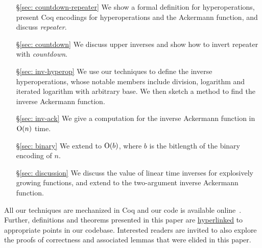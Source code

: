 \begin{itemize}
	\item[\S\ref{sec: countdown-repeater}] We show a formal definition for hyperoperations, present Coq encodings for hyperoperations and the Ackermann function, and discuss \emph{repeater}.
	\item[\S\ref{sec: countdown}] We discuss upper inverses and show how to invert repeater with \emph{countdown}.
	\item[\S\ref{sec: inv-hyperop}] We use our techniques to define the inverse hyperoperations, whose notable members include division, logarithm and iterated logarithm with arbitrary base. We then sketch a method to find the inverse Ackermann function.
	\item[\S\ref{sec: inv-ack}] We give a computation for the inverse Ackermann function in $\text{O}(n)$ time.
	\item[\S\ref{sec: binary}] We extend to $\text{O}(b)$, where $b$ is the bitlength
	of the binary encoding of $n$.
	\item[\S\ref{sec: discussion}] We discuss the value of linear time inverses for
explosively growing functions, and extend to the two-argument inverse Ackermann function. %
\end{itemize}
All our techniques are mechanized in Coq and our code is available
online~\cite{inv-ack}. Further, definitions and theorems presented
in this paper are \href{https://github.com/inv-ack/inv-ack}{hyperlinked}
to appropriate points in our codebase. Interested readers are invited to also
explore the proofs of correctness and associated lemmas that were elided in this paper.

